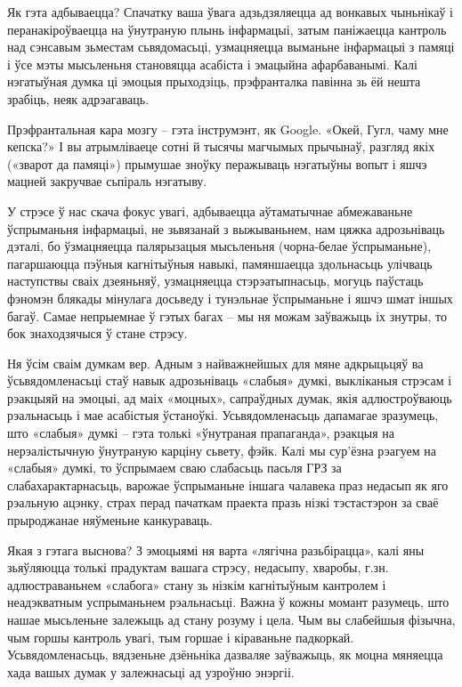 Як гэта адбываецца? Спачатку ваша ўвага адзьдзяляецца ад вонкавых чыньнікаў і перанакіроўваецца на ўнутраную плынь інфармацыі, затым паніжаецца кантроль над сэнсавым зьместам сьвядомасьці, узмацняецца выманьне інфармацыі з памяці і ўсе мэты мысьленьня становяцца асабіста і эмацыйна афарбаванымі. Калі нэгатыўная думка ці эмоцыя прыходзіць, прэфранталка павінна зь ёй нешта зрабіць, неяк адрэагаваць.

Прэфрантальная кара мозгу – гэта інструмэнт, як Google. «Окей, Гугл, чаму мне кепска?» І вы атрымліваеце сотні й тысячы магчымых прычынаў, разгляд якіх («зварот да памяці») прымушае зноўку перажываць нэгатыўны вопыт і яшчэ мацней закручвае сьпіраль нэгатыву.

У стрэсе ў нас скача фокус увагі, адбываецца аўтаматычнае абмежаваньне ўспрыманьня інфармацыі, не зьвязанай з выжываньнем, нам цяжка адрозьніваць дэталі, бо ўзмацняецца палярызацыя мысьленьня (чорна-белае ўспрыманьне), пагаршаюцца пэўныя кагнітыўныя навыкі, памяншаецца здольнасьць улічваць наступствы сваіх дзеяньняў, узмацняецца стэрэатыпнасьць, могуць паўстаць фэномэн блякады мінулага досьведу і тунэльнае ўспрыманьне і яшчэ шмат іншых багаў. Самае непрыемнае ў гэтых багах – мы ня можам заўважыць іх знутры, то бок знаходзячыся ў стане стрэсу.

Ня ўсім сваім думкам вер. Адным з найважнейшых для мяне адкрыцьцяў ва ўсьвядомленасьці стаў навык адрозьніваць «слабыя» думкі, выкліканыя стрэсам і рэакцыяй на эмоцыі, ад маіх «моцных», сапраўдных думак, якія адлюстроўваюць рэальнасьць і мае асабістыя ўстаноўкі. Усьвядомленасьць дапамагае зразумець, што «слабыя» думкі – гэта толькі «ўнутраная прапаганда», рэакцыя на нерэалістычную ўнутраную карціну сьвету, фэйк. Калі мы сур'ёзна рэагуем на «слабыя» думкі, то ўспрымаем сваю слабасьць пасьля ГРЗ за слабахарактарнасьць, варожае ўспрыманьне іншага чалавека праз недасып як яго рэальную ацэнку, страх перад пачаткам праекта празь нізкі тэстастэрон за сваё прыроджанае няўменьне канкураваць. 

Якая з гэтага выснова? З эмоцыямі ня варта «лягічна разьбірацца», калі яны зьяўляюцца толькі прадуктам вашага стрэсу, недасыпу, хваробы, г.зн. адлюстраваньнем «слабога» стану зь нізкім кагнітыўным кантролем і неадэкватным успрыманьнем рэальнасьці. Важна ў кожны момант разумець, што нашае мысьленьне залежыць ад стану розуму і цела. Чым вы слабейшыя фізычна, чым горшы кантроль увагі, тым горшае і кіраваньне падкоркай. Усьвядомленасьць, вядзеньне дзёньніка дазваляе заўважыць, як моцна мяняецца хада вашых думак у залежнасьці ад узроўню энэргіі.

